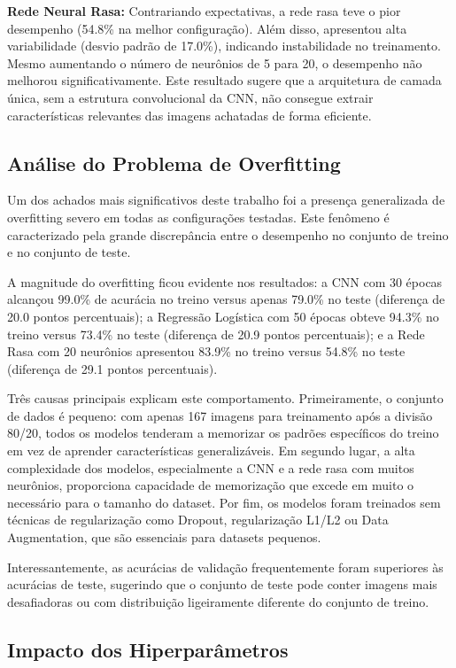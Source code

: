 \documentclass[a4paper,12pt]{article}
\begin{document}
\textbf{Rede Neural Rasa:} Contrariando expectativas, a rede rasa teve o pior desempenho (54.8\% na melhor configuração). Além disso, apresentou alta variabilidade (desvio padrão de 17.0\%), indicando instabilidade no treinamento. Mesmo aumentando o número de neurônios de 5 para 20, o desempenho não melhorou significativamente. Este resultado sugere que a arquitetura de camada única, sem a estrutura convolucional da CNN, não consegue extrair características relevantes das imagens achatadas de forma eficiente.

\subsection{Análise do Problema de Overfitting}

Um dos achados mais significativos deste trabalho foi a presença generalizada de overfitting severo em todas as configurações testadas. Este fenômeno é caracterizado pela grande discrepância entre o desempenho no conjunto de treino e no conjunto de teste.

A magnitude do overfitting ficou evidente nos resultados: a CNN com 30 épocas alcançou 99.0\% de acurácia no treino versus apenas 79.0\% no teste (diferença de 20.0 pontos percentuais); a Regressão Logística com 50 épocas obteve 94.3\% no treino versus 73.4\% no teste (diferença de 20.9 pontos percentuais); e a Rede Rasa com 20 neurônios apresentou 83.9\% no treino versus 54.8\% no teste (diferença de 29.1 pontos percentuais).

Três causas principais explicam este comportamento. Primeiramente, o conjunto de dados é pequeno: com apenas 167 imagens para treinamento após a divisão 80/20, todos os modelos tenderam a memorizar os padrões específicos do treino em vez de aprender características generalizáveis. Em segundo lugar, a alta complexidade dos modelos, especialmente a CNN e a rede rasa com muitos neurônios, proporciona capacidade de memorização que excede em muito o necessário para o tamanho do dataset. Por fim, os modelos foram treinados sem técnicas de regularização como Dropout, regularização L1/L2 ou Data Augmentation, que são essenciais para datasets pequenos.

Interessantemente, as acurácias de validação frequentemente foram superiores às acurácias de teste, sugerindo que o conjunto de teste pode conter imagens mais desafiadoras ou com distribuição ligeiramente diferente do conjunto de treino.

\subsection{Impacto dos Hiperparâmetros}
\end{document}
